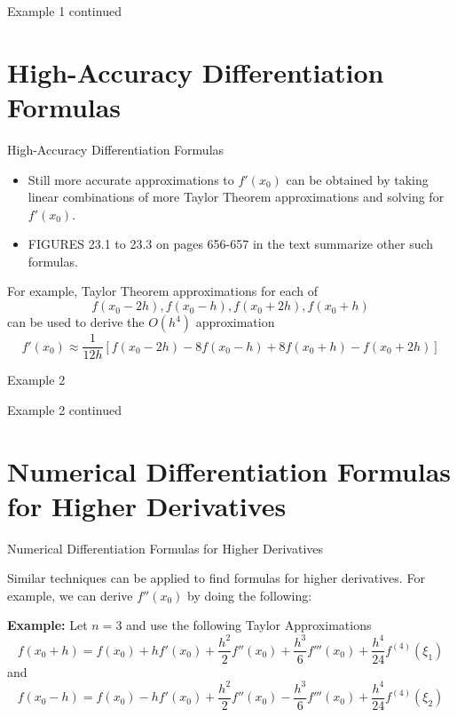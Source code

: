 \documentclass[12pt]{beamer}
\begin{document}
\begin{frame}{Example 1 continued}

\end{frame}

\section{High-Accuracy Differentiation Formulas}

\begin{frame}{High-Accuracy Differentiation Formulas}
\begin{itemize}
\item{Still more accurate approximations to $f'(x_0)$ can be obtained by taking linear combinations of more Taylor Theorem approximations and solving for $f'(x_0)$.}
\item{FIGURES 23.1 to 23.3 on pages 656-657 in the text summarize other such formulas.}
\end{itemize}
For example, Taylor Theorem approximations for each of
\[
f(x_0-2h),f(x_0-h),f(x_0+2h),f(x_0+h)
\]
can be used to derive the $O(h^4)$ approximation
\[
f'(x_0) \approx \frac{1}{12h} \left [f(x_0-2h)-8f(x_0-h)+8f(x_0+h)-f(x_0+2h) \right ]
\]
\end{frame}

\begin{frame}{Example 2}

\end{frame}

\begin{frame}{Example 2 continued}

\end{frame}

\section{Numerical Differentiation Formulas for Higher Derivatives}

\begin{frame}{Numerical Differentiation Formulas for Higher Derivatives}

Similar techniques can be applied to find formulas for higher derivatives. For example, we can derive $f''(x_0)$ by doing the following:

{\bf Example:} Let $n=3$ and use the following Taylor Approximations
\begin{equation*}
f(x_0+h) = f(x_0) + hf'(x_0) + \frac{h^2}{2}f''(x_0) + \frac{h^3}{6}f'''(x_0) + \frac{h^4}{24}f^{(4)}(\xi_1)
\end{equation*}
and
\begin{equation*}
f(x_0-h) = f(x_0) - hf'(x_0) + \frac{h^2}{2}f''(x_0) - \frac{h^3}{6}f'''(x_0) + \frac{h^4}{24}f^{(4)}(\xi_2)
\end{equation*}
\end{frame}
\end{document}
